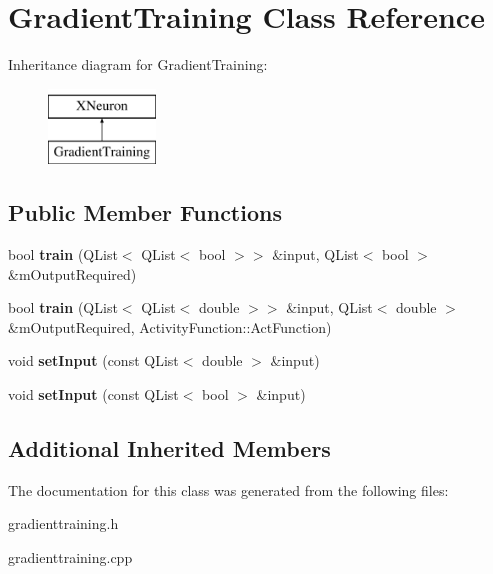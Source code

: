 \hypertarget{class_gradient_training}{}\section{Gradient\+Training Class Reference}
\label{class_gradient_training}
Inheritance diagram for Gradient\+Training\+:\begin{figure}[H]
\begin{center}
\leavevmode
\includegraphics[height=2.000000cm]{class_gradient_training}
\end{center}
\end{figure}
\subsection*{Public Member Functions}
\begin{DoxyCompactItemize}
\item 
\hypertarget{class_gradient_training_ac07db2db785c492f0f1f487703db3c43}{}\label{class_gradient_training_ac07db2db785c492f0f1f487703db3c43} 
bool {\bfseries train} (Q\+List$<$ Q\+List$<$ bool $>$$>$ \&input, Q\+List$<$ bool $>$ \&m\+Output\+Required)
\item 
\hypertarget{class_gradient_training_a47832ffd21c1775e017a56c03e8dbcde}{}\label{class_gradient_training_a47832ffd21c1775e017a56c03e8dbcde} 
bool {\bfseries train} (Q\+List$<$ Q\+List$<$ double $>$$>$ \&input, Q\+List$<$ double $>$ \&m\+Output\+Required, Activity\+Function\+::\+Act\+Function)
\item 
\hypertarget{class_gradient_training_af873e61fa596a89d3acde7c9804aa649}{}\label{class_gradient_training_af873e61fa596a89d3acde7c9804aa649} 
void {\bfseries set\+Input} (const Q\+List$<$ double $>$ \&input)
\item 
\hypertarget{class_gradient_training_a96d4b979eae8e144f46c2fc6df4548bd}{}\label{class_gradient_training_a96d4b979eae8e144f46c2fc6df4548bd} 
void {\bfseries set\+Input} (const Q\+List$<$ bool $>$ \&input)
\end{DoxyCompactItemize}
\subsection*{Additional Inherited Members}


The documentation for this class was generated from the following files\+:\begin{DoxyCompactItemize}
\item 
gradienttraining.\+h\item 
gradienttraining.\+cpp\end{DoxyCompactItemize}
